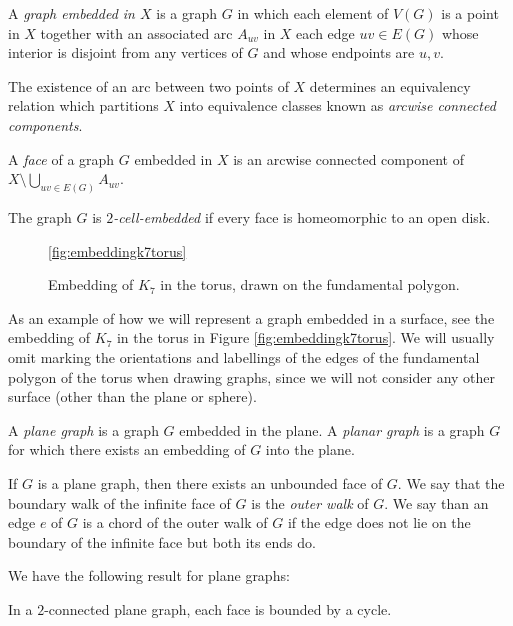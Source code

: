 \begin{definition}
A \emph{graph embedded in $X$} is a graph $G$ in which each element
of $V(G)$ is a point in $X$ together with an associated arc $A_{uv}$ in $X$  each edge $uv \in E(G)$ whose 
interior is disjoint from any vertices of $G$ and whose endpoints are $u, v$. 
\end{definition}

The existence of an arc between two points of $X$ determines an equivalency relation which 
partitions $X$ into equivalence classes known as \emph{arcwise connected components}.

\begin{definition}
A \emph{face} of a graph $G$ embedded in $X$ is an arcwise connected component of
$X \setminus \bigcup_{uv \in E(G)} A_{uv}$. 

The graph $G$ is \emph{$2$-cell-embedded} if every face is homeomorphic to an open disk.
\end{definition}

\begin{figure}
\ref{fig:embeddingk7torus}
\centering
{}
\caption{Embedding of $K_7$ in the torus, drawn on the fundamental polygon.}
\end{figure}

As an example of how we will represent a graph embedded in a surface, see the embedding of $K_7$
in the torus in Figure \ref{fig:embeddingk7torus}. We will usually omit marking the orientations
and labellings of the edges of the fundamental polygon of the torus when drawing graphs, since
we will not consider any other surface (other than the plane or sphere). 

\begin{definition}
A \emph{plane graph} is a graph $G$ embedded in the plane. A \emph{planar graph} is a graph $G$ for which there exists an embedding of $G$ into the plane. 

If $G$ is a plane graph, then there exists an unbounded face of $G$. We say 
that the boundary walk of the infinite face of $G$ is the \emph{outer walk} of $G$. We say
than an edge $e$ of $G$ is a chord of the outer walk of $G$ if the edge does not lie on the
boundary of the infinite face but both its ends do. 
\end{definition}

We have the following result for plane graphs:

\begin{theorem}
In a $2$-connected plane graph, each face is bounded by a cycle.
\end{theorem}


